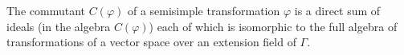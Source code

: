 The commutant $C(\varphi)$ of a semisimple transformation $\varphi$ is a direct sum of ideals (in the algebra $C(\varphi)$) each of which is isomorphic to the full algebra of transformations of a vector space over an extension field of $\Gamma$.
